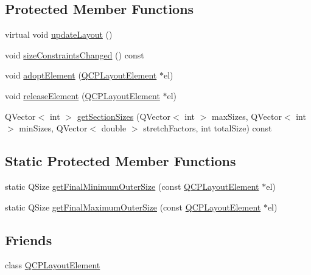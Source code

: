 \subsection*{Protected Member Functions}
\begin{DoxyCompactItemize}
\item 
virtual void \hyperlink{class_q_c_p_layout_a165c77f6287ac92e8d03017ad913378b}{update\+Layout} ()
\item 
void \hyperlink{class_q_c_p_layout_aeac66a292f65cf7f8adf94eb92345b3e}{size\+Constraints\+Changed} () const
\item 
void \hyperlink{class_q_c_p_layout_af6dbbc24156a808da29cd1ec031729a3}{adopt\+Element} (\hyperlink{class_q_c_p_layout_element}{Q\+C\+P\+Layout\+Element} $\ast$el)
\item 
void \hyperlink{class_q_c_p_layout_a4afbb4bef0071f72f91afdac4433a18e}{release\+Element} (\hyperlink{class_q_c_p_layout_element}{Q\+C\+P\+Layout\+Element} $\ast$el)
\item 
Q\+Vector$<$ int $>$ \hyperlink{class_q_c_p_layout_a3e77be8006d39f2aafc1313d6e8fc3fd}{get\+Section\+Sizes} (Q\+Vector$<$ int $>$ max\+Sizes, Q\+Vector$<$ int $>$ min\+Sizes, Q\+Vector$<$ double $>$ stretch\+Factors, int total\+Size) const
\end{DoxyCompactItemize}
\subsection*{Static Protected Member Functions}
\begin{DoxyCompactItemize}
\item 
static Q\+Size \hyperlink{class_q_c_p_layout_a864fddc84721f186663faf3683f1fa70}{get\+Final\+Minimum\+Outer\+Size} (const \hyperlink{class_q_c_p_layout_element}{Q\+C\+P\+Layout\+Element} $\ast$el)
\item 
static Q\+Size \hyperlink{class_q_c_p_layout_add49fd6843821a6126914b837ed52e22}{get\+Final\+Maximum\+Outer\+Size} (const \hyperlink{class_q_c_p_layout_element}{Q\+C\+P\+Layout\+Element} $\ast$el)
\end{DoxyCompactItemize}
\subsection*{Friends}
\begin{DoxyCompactItemize}
\item 
class \hyperlink{class_q_c_p_layout_a0790750c7e7f14fdbd960d172655b42b}{Q\+C\+P\+Layout\+Element}
\end{DoxyCompactItemize}
